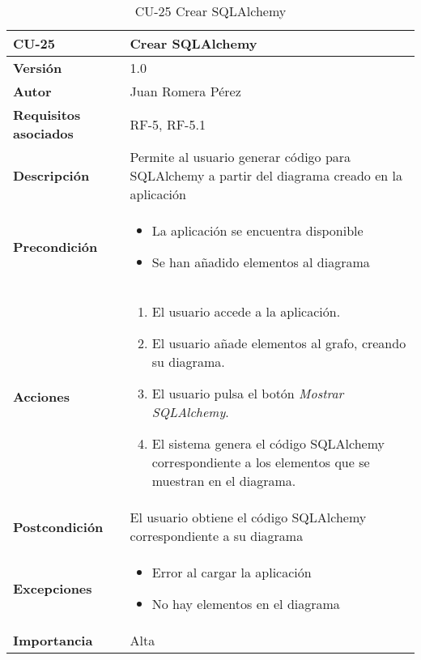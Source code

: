\begin{table}[p]
    \centering
    \begin{tabularx}{\linewidth}{ p{} p{}}
		\toprule
		\textbf{CU-25}    & \textbf{Crear SQLAlchemy}\\
		\toprule
		\textbf{Versión}              & 1.0    \\
		\textbf{Autor}                & Juan Romera Pérez \\
		\textbf{Requisitos asociados} & RF-5, RF-5.1 \\
		\textbf{Descripción}          & Permite al usuario generar código para SQLAlchemy a partir del diagrama creado en la aplicación \\
		\textbf{Precondición}         & \begin{itemize}
		    \item La aplicación se encuentra disponible
            \item Se han añadido elementos al diagrama
		\end{itemize} \\
		\textbf{Acciones}             &
		\begin{enumerate}
			\def\labelenumi{\arabic{enumi}.}
			\tightlist
			\item El usuario accede a la aplicación.
			\item El usuario añade elementos al grafo, creando su diagrama.
            \item El usuario pulsa el botón \emph{Mostrar SQLAlchemy}.
            \item El sistema genera el código SQLAlchemy correspondiente a los elementos que se muestran en el diagrama.
		\end{enumerate}\\
		\textbf{Postcondición}        & El usuario obtiene el código SQLAlchemy correspondiente a su diagrama \\
		\textbf{Excepciones}          & \begin{itemize}
		    \item Error al cargar la aplicación
            \item No hay elementos en el diagrama
		\end{itemize} \\
		\textbf{Importancia}          & Alta \\
		\bottomrule
    \end{tabularx}
    \caption{CU-25 Crear SQLAlchemy}
\end{table}